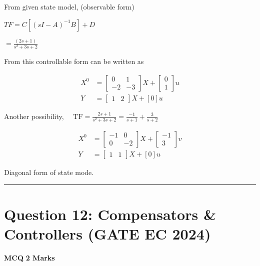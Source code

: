 \documentclass[11pt,a4paper]{article}
\begin{document}
\begin{tcolorbox}[solbox, title=Detailed Solution -- Question 11]
From given state model, (observable form)

 $T F=C\left[(s I-A)^{-1} B\right]+D$

 $=\frac{(2 s+1)}{s^{2}+3 s+2}$

From this controllable form can be written as

 
\[
\begin{aligned}
X^{0} & =\left[\begin{array}{cc}
0 & 1 \\
-2 & -3
\end{array}\right] X+\left[\begin{array}{l}
0 \\
1
\end{array}\right] u \\
Y & =\left[\begin{array}{ll}
1 & 2
\end{array}\right] X+[0] u
\end{aligned}
\]

Another possibility, $\quad \mathrm{TF}=\frac{2 s+1}{s^{2}+3 s+2}=\frac{-1}{s+1}+\frac{3}{s+2}$

 
\[
\begin{aligned}
X^{0} & =\left[\begin{array}{cc}
-1 & 0 \\
0 & -2
\end{array}\right] X+\left[\begin{array}{c}
-1 \\
3
\end{array}\right] v \\
Y & =\left[\begin{array}{ll}
1 & 1
\end{array}\right] X+[0] u
\end{aligned}
\]

Diagonal form of state mode.
\end{tcolorbox}

\vspace{1.5em}
\hrule
\vspace{1.5em}

\section*{Question 12: Compensators \& Controllers (GATE EC 2024)}
\noindent \textbf{\color{primary}MCQ} \hfill \textbf{\color{secondary}2 Marks}
\end{document}
